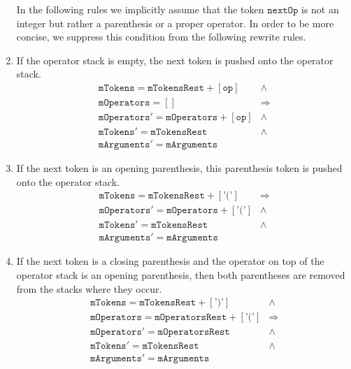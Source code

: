 \begin{enumerate}
      In the following rules we implicitly assume that the token $\texttt{nextOp}$ is not an integer but rather a parenthesis
      or a proper operator.  In order to be more concise, we suppress this condition from the following rewrite rules.
\item If the operator stack is empty, the next token is pushed onto the operator stack.
    $$\begin{array}{lc}
        \texttt{mTokens} = \texttt{mTokensRest} + [\texttt{op} ] & \wedge \\
        \texttt{mOperators} = []                                 & \Rightarrow \\[0.2cm]
        \texttt{mOperators}' = \texttt{mOperators} + [\texttt{op}] & \wedge \\
        \texttt{mTokens}' = \texttt{mTokensRest} & \wedge \\
        \texttt{mArguments}' = \texttt{mArguments} 
        \end{array} 
      $$
\item If the next token is an opening parenthesis, this parenthesis token is pushed onto the operator stack.
     $$\begin{array}{lcll}
         \texttt{mTokens} = \texttt{mTokensRest} + [\texttt{'('} ] & \Rightarrow \\[0.2cm]
         \texttt{mOperators}' = \texttt{mOperators} + [\texttt{'('}] & \wedge \\
         \texttt{mTokens}' = \texttt{mTokensRest} & \wedge \\
         \texttt{mArguments}' = \texttt{mArguments} 
         \end{array} 
      $$
\item If the next token is a closing parenthesis and the operator on top of the operator stack is an opening
      parenthesis, then both parentheses are removed from the stacks where they occur.
     $$\begin{array}{lc}
         \texttt{mTokens} = \texttt{mTokensRest} + [\texttt{')'}] & \wedge \\
         \texttt{mOperators} = \texttt{mOperatorsRest} + [\texttt{'('}] & \Rightarrow \\[0.2cm]
         \texttt{mOperators}' = \texttt{mOperatorsRest} & \wedge \\
         \texttt{mTokens}' = \texttt{mTokensRest} & \wedge \\
         \texttt{mArguments}' = \texttt{mArguments} 
         \end{array} 
      $$

\end{enumerate}
